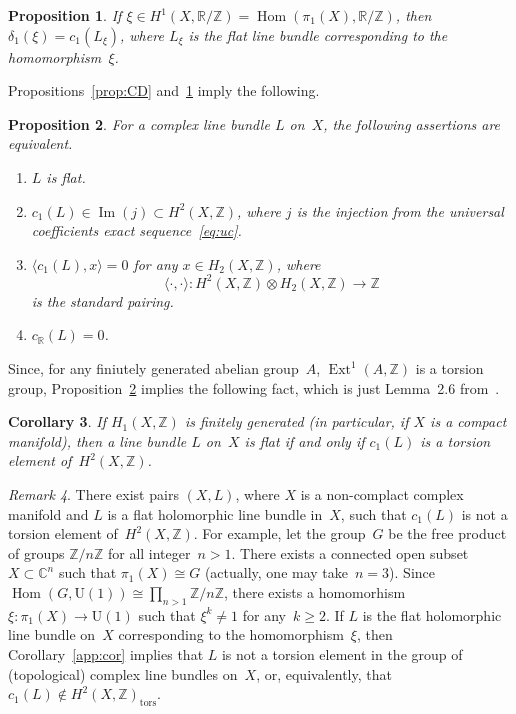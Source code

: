 \documentclass[11pt]{amsart}
\newcommand*{\C}{{\mathbb C}}
\newcommand*{\R}{{\mathbb R}}
\newcommand*{\Z}{{\mathbb Z}}
\DeclareMathOperator{\Ext}{Ext}
\DeclareMathOperator{\Hom}{Hom}
\def\Im{\mathop{\mathrm{Im}}\nolimits}
\newtheorem{proposition}{Proposition}[section]
\newtheorem{corollary}[proposition]{Corollary}
\theoremstyle{remark}
\newtheorem{remark}[proposition]{Remark}
\theoremstyle{definition}
\begin{document}
\begin{proposition}\label{c_1(/Ll)}
If $\xi\in H^1(X,\R/\Z)=\Hom(\pi_1(X),\R/\Z)$, then
$\delta_1(\xi)=c_1(L_\xi)$, where $L_\xi$ is the flat line bundle
corresponding to the homomorphism~$\xi$.   
\end{proposition}

Propositions~\ref{prop:CD} and~\ref{c_1(/Ll)} imply the following.

\begin{proposition}\label{4equiv}
For a complex line bundle $L$ on~$X$, the following assertions
are equivalent.
\begin{enumerate}
\item $L$ is flat.
\item $c_1(L)\in\Im(j)\subset H^2(X,\Z)$, where $j$ is the injection
  from the universal coefficients exact sequence~\eqref{eq:uc}.
\item $\langle c_1(L),x\rangle=0$ for any $x\in H_2(X,\Z)$, where 
  \begin{equation*}
\langle \cdot,\cdot\rangle\colon H^2(X,\Z)\otimes H_2(X,\Z)\to\Z    
  \end{equation*}
  is the standard pairing.
\item $c_\R(L)=0$.  
\end{enumerate}
\end{proposition}

Since, for any finiutely generated abelian group~$A$, $\Ext^1(A,\Z)$
is a torsion group, Proposition~\ref{4equiv} implies the following
fact, which is just Lemma~2.6 from~\cite{Putman}.

\begin{corollary}
If $H_1(X,\Z)$ is finitely generated \textup(in particular, if $X$ is
a compact manifold\textup), then a line bundle $L$ on~$X$ is
flat if and only if
$c_1(L)$ is a torsion element of~$H^2(X,\Z)$.  
\end{corollary}

\begin{remark}
There exist pairs $(X,L)$, where $X$ is a non-complact complex
manifold and $L$ is a flat holomorphic line bundle in~$X$, such that
$c_1(L)$ is not a torsion element of~$H^2(X,\Z)$. For example, let the
group~$G$ be the free product of groups $\Z/n\Z$ for all integer~$n>
1$. There exists a connected open subset $X\subset\C^n$ such that
$\pi_1(X)\cong G$ (actually, one may take~$n=3$). Since
$\Hom(G,\mathrm U(1))\cong \prod_{n>1}\Z/n\Z$, there exists a
homomorhism $\xi\colon\pi_1(X)\to\mathrm U(1)$ such that $\xi^k\ne1$
for any~$k\ge2$. If $L$ is the flat holomorphic line bundle on~$X$
corresponding to the homomorphism~$\xi$, then Corollary~\ref{app:cor}
implies that $L$ is not a torsion element in the group of
(topological) complex line bundles on~$X$, or, equivalently, that
$c_1(L)\notin H^2(X,\Z)_{\mathrm{tors}}$.
\end{remark}





\end{document}
